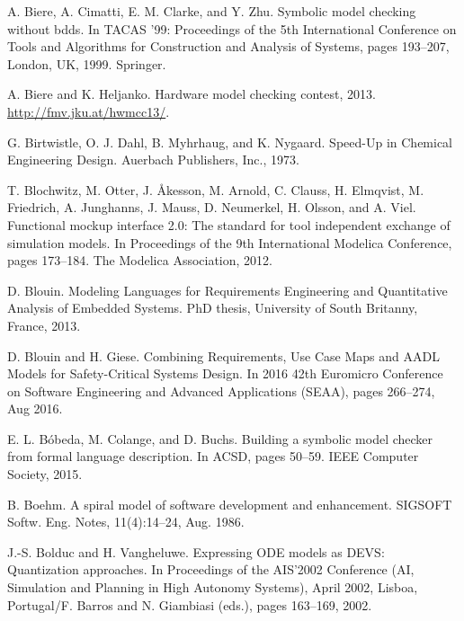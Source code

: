 \begin{description}[style=nextline,leftmargin=12mm,labelwidth=10mm,font=\normalfont]
\item[{[33]}] A. Biere, A. Cimatti, E. M. Clarke, and Y. Zhu. Symbolic model checking without bdds. In TACAS ’99: Proceedings of the 5th International Conference on Tools and Algorithms for Construction and Analysis of Systems, pages 193–207, London, UK, 1999. Springer.

\item[{[34]}] A. Biere and K. Heljanko. Hardware model checking contest, 2013. \url{http://fmv.jku.at/hwmcc13/}.

\item[{[35]}] G. Birtwistle, O. J. Dahl, B. Myhrhaug, and K. Nygaard. Speed-Up in Chemical Engineering Design. Auerbach Publishers, Inc., 1973.

\item[{[36]}] T. Blochwitz, M. Otter, J. Åkesson, M. Arnold, C. Clauss, H. Elmqvist, M. Friedrich, A. Junghanns, J. Mauss, D. Neumerkel, H. Olsson, and A. Viel. Functional mockup interface 2.0: The standard for tool independent exchange of simulation models. In Proceedings of the 9th International Modelica Conference, pages 173–184. The Modelica Association, 2012.

\item[{[37]}] D. Blouin. Modeling Languages for Requirements Engineering and Quantitative Analysis of Embedded Systems. PhD thesis, University of South Britanny, France, 2013.

\item[{[38]}] D. Blouin and H. Giese. Combining Requirements, Use Case Maps and AADL Models for Safety-Critical Systems Design. In 2016 42th Euromicro Conference on Software Engineering and Advanced Applications (SEAA), pages 266–274, Aug 2016.

\item[{[39]}] E. L. Bóbeda, M. Colange, and D. Buchs. Building a symbolic model checker from formal language description. In ACSD, pages 50–59. IEEE Computer Society, 2015.

\item[{[40]}] B. Boehm. A spiral model of software development and enhancement. SIGSOFT Softw. Eng. Notes, 11(4):14–24, Aug. 1986.

\item[{[41]}] J.-S. Bolduc and H. Vangheluwe. Expressing ODE models as DEVS: Quantization approaches. In Proceedings of the AIS’2002 Conference (AI, Simulation and Planning in High Autonomy Systems), April 2002, Lisboa, Portugal/F. Barros and N. Giambiasi (eds.), pages 163–169, 2002.


\end{description}
